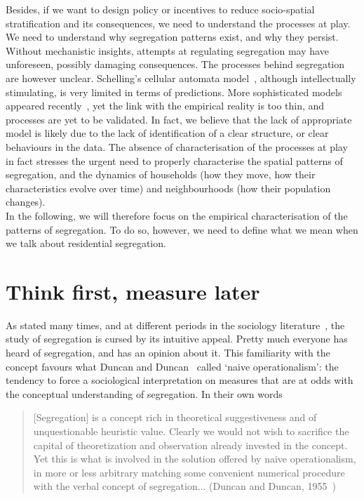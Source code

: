 Besides, if we want to design policy or incentives to reduce socio-spatial
stratification and its consequences, we need to understand the processes at
play. We need to understand why segregation patterns exist, and why they
persist. Without mechanistic insights, attempts at regulating segregation may
have unforeseen, possibly damaging consequences.  The processes behind
segregation are however unclear. Schelling's cellular automata
model~\cite{Schelling:1971}, although intellectually stimulating, is very
limited in terms of predictions. More sophisticated models appeared
recently~\cite{Brueckner:1999,Glaeser:2008,Gauvin:2013}, yet the link with the
empirical reality is too thin, and processes are yet to be validated.  In fact,
we believe that the lack of appropriate model is likely due to the lack of
identification of a clear structure, or clear behaviours in the data. The
absence of characterisation of the processes at play in fact stresses the urgent
need to properly characterise the spatial patterns of segregation, and the
dynamics of households (how they move, how their characteristics evolve over
time) and neighbourhoods (how their population changes).\\

In the following, we will therefore focus on the empirical characterisation of
the patterns of segregation. To do so, however, we need to define what we mean
when we talk about residential segregation.

\section{Think first, measure later}
\label{sec:introduction}

As stated many times, and at different periods in the sociology
literature~\cite{Duncan:1955m,James:1982,Massey:1988,Reardon:2002}, the study of
segregation is cursed by its intuitive appeal. Pretty much everyone has heard of
segregation, and has an opinion about it. This familiarity with the concept
favours what Duncan and Duncan~\cite{Duncan:1955m} called `naive operationalism':
the tendency to force a sociological interpretation on measures that are at odds
with the conceptual understanding of segregation. In their own words

\begin{quote}
    [Segregation] is a concept rich in theoretical suggestiveness and of
    unquestionable heuristic value. Clearly we would not wish to sacrifice the
    capital of theoretization and observation already invested in the concept.
    Yet this is what is involved in the solution offered by naive
    operationalism, in more or less arbitrary matching some convenient numerical
    procedure with the verbal concept of segregation... (Duncan and Duncan,
    1955~\cite{Duncan:1955m})
\end{quote}

